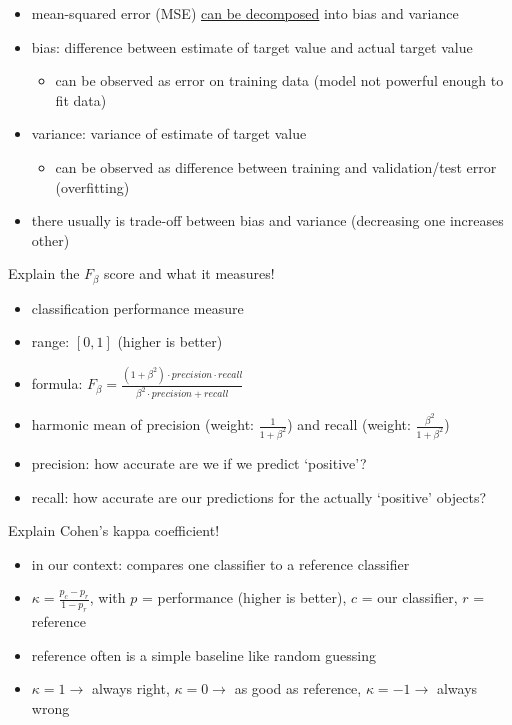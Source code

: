\documentclass[12pt]{article}
\begin{document}
\begin{itemize}[left=0pt, nosep]
	\item mean-squared error (MSE) \href{https://en.wikipedia.org/wiki/Bias%E2%80%93variance_tradeoff}{can be decomposed} into bias and variance
	\item bias: difference between estimate of target value and actual target value
	\begin{itemize}[left=0pt, nosep]
		\item can be observed as error on training data (model not powerful enough to fit data)
	\end{itemize}
	\item variance: variance of estimate of target value
	\begin{itemize}[left=0pt, nosep]
		\item can be observed as difference between training and validation/test error (overfitting)
	\end{itemize}
	\item there usually is trade-off between bias and variance (decreasing one increases other)
\end{itemize}

\begin{question}
	Explain the $F_{\beta}$ score and what it measures!
\end{question}

\begin{itemize}[left=0pt, nosep]
	\item classification performance measure
	\item range: $[0,1]$ (higher is better)
	\item formula: $F_{\beta} = \frac{(1 + \beta^2) \cdot precision \cdot recall}{\beta^2 \cdot precision + recall}$
	\item harmonic mean of precision (weight: $\frac{1}{1 + \beta^2}$) and recall (weight: $\frac{\beta^2}{1 + \beta^2}$)
	\item precision: how accurate are we if we predict `positive'?
	\item recall: how accurate are our predictions for the actually `positive' objects?
\end{itemize}

\begin{question}
	Explain Cohen's kappa coefficient!
\end{question}

\begin{itemize}[left=0pt, nosep]
	\item in our context: compares one classifier to a reference classifier
	\item $\kappa = \frac{p_c - p_r}{1 - p_r}$, with $p$ = performance (higher is better), $c$ = our classifier, $r$ = reference
	\item reference often is a simple baseline like random guessing
	\item $\kappa=1 \rightarrow$ always right, $\kappa=0 \rightarrow$ as good as reference, $\kappa=-1 \rightarrow$ always wrong
\end{itemize}
\end{document}

